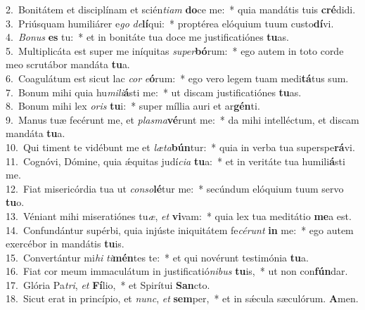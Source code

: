 {2.~}Bonitátem et disciplínam et scién\textit{ti}\textit{am} \textbf{do}ce me:~* quia mandátis tuis \textbf{cré}didi.\\
{3.~}Priúsquam humiliárer e\textit{go} \textit{de}\textbf{lí}qui:~* proptérea elóquium tuum custo\textbf{dí}vi.\\
{4.~}\textit{Bo}\textit{nus} \textbf{es} tu:~* et in bonitáte tua doce me justificatiónes \textbf{tu}as.\\
{5.~}Multiplicáta est super me iníquitas \textit{su}\textit{per}\textbf{bó}rum:~* ego autem in toto corde meo scrutábor mandáta \textbf{tu}a.\\
{6.~}Coagulátum est sicut lac \textit{cor} \textit{e}\textbf{ó}rum:~* ego vero legem tuam medi\textbf{tá}tus sum.\\
{7.~}Bonum mihi quia hu\textit{mi}\textit{li}\textbf{á}sti me:~* ut discam justificatiónes \textbf{tu}as.\\
{8.~}Bonum mihi lex \textit{o}\textit{ris} \textbf{tu}i:~* super míllia auri et ar\textbf{gén}ti.\\
{9.~}Manus tuæ fecérunt me, et \textit{plas}\textit{ma}\textbf{vé}runt me:~* da mihi intelléctum, et discam mandáta \textbf{tu}a.\\
{10.~}Qui timent te vidébunt me et \textit{læ}\textit{ta}\textbf{bún}tur:~* quia in verba tua superspe\textbf{rá}vi.\\
{11.~}Cognóvi, Dómine, quia ǽquitas judí\textit{ci}\textit{a} \textbf{tu}a:~* et in veritáte tua humili\textbf{á}sti me.\\
{12.~}Fiat misericórdia tua ut \textit{con}\textit{so}\textbf{lé}tur me:~* secúndum elóquium tuum servo \textbf{tu}o.\\
{13.~}Véniant mihi miseratiónes tu\textit{æ}, \textit{et} \textbf{vi}vam:~* quia lex tua meditátio \textbf{me}a est.\\
{14.~}Confundántur supérbi, quia injúste iniquitátem fe\textit{cé}\textit{runt} \textbf{in} me:~* ego autem exercébor in mandátis \textbf{tu}is.\\
{15.~}Convertántur mi\textit{hi} \textit{ti}\textbf{mén}tes te:~* et qui novérunt testimónia \textbf{tu}a.\\
{16.~}Fiat cor meum immaculátum in justificatió\textit{ni}\textit{bus} \textbf{tu}is,~* ut non con\textbf{fún}dar.\\
{17.~}Glória Pa\textit{tri}, \textit{et} \textbf{Fí}lio,~* et Spirítui \textbf{San}cto.\\
{18.~}Sicut erat in princípio, et \textit{nunc}, \textit{et} \textbf{sem}per,~* et in sǽcula sæculórum. \textbf{A}men.\\
